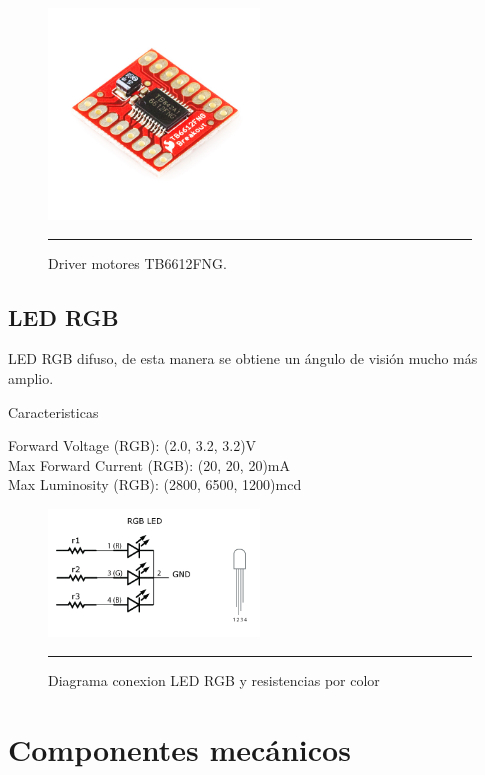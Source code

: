 \begin{figure}[htbp]
	\centering
		\includegraphics[width=0.5\textwidth]{./Figures/MODI/TB6612FNG.jpg}
		\rule{35em}{0.5pt}
	\caption[TB6612FNG]{Driver motores TB6612FNG.}
	\label{fig:TB6612FNG}
\end{figure}


\subsection{LED RGB}

LED RGB difuso, de esta manera se obtiene un ángulo de visión mucho más amplio.

Caracteristicas

Forward Voltage (RGB): (2.0, 3.2, 3.2)V \\
Max Forward Current (RGB): (20, 20, 20)mA \\
Max Luminosity (RGB): (2800, 6500, 1200)mcd

\begin{figure}[htbp]
	\centering
		\includegraphics[width=0.5\textwidth]{./Figures/MODI/RGBLED.png}
		\rule{35em}{0.5pt}
	\caption[ledRGB]{Diagrama conexion LED RGB y resistencias por color}
	\label{fig:ledRGB}
\end{figure}

\section{Componentes mecánicos}

